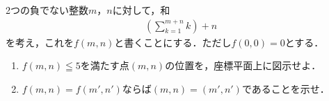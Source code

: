 \documentclass[../../main.tex]{subfiles}
\begin{document}
2つの負でない整数$m$，$n$に対して，和
\begin{align}
  \left( \sum_{k=1}^{m+n} k \right) + n
\end{align}
を考え，これを$f(m,n)$と書くことにする．ただし$f(0,0)=0$とする．
\begin{enumerate}
  \item $f(m,n) \leqq 5$を満たす点$(m,n)$の位置を，座標平面上に図示せよ．
  \item $f(m,n)=f(m',n')$ならば$(m,n)=(m',n')$であることを示せ．
\end{enumerate}
\end{document}
